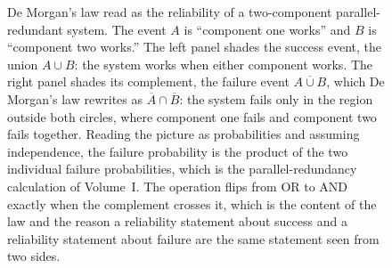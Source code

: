 \begin{figure}[htbp]
\centering
{}
\caption[De Morgan's law as a redundancy statement]{De Morgan's law read as
the reliability of a two-component parallel-redundant system. The event $A$
is ``component one works'' and $B$ is ``component two works.'' The left panel
shades the success event, the union $A\cup B$: the system works when either
component works. The right panel shades its complement, the failure event
$\overline{A\cup B}$, which De Morgan's law rewrites as $\overline{A}\cap
\overline{B}$: the system fails only in the region outside both circles,
where component one fails and component two fails together. Reading the
picture as probabilities and assuming independence, the failure probability
is the product of the two individual failure probabilities, which is the
parallel-redundancy calculation of Volume~I. The operation flips from OR to
AND exactly when the complement crosses it, which is the content of the law
and the reason a reliability statement about success and a reliability
statement about failure are the same statement seen from two sides.}
\label{fig:vol02:ch01:de-morgan-redundancy}
\end{figure}
